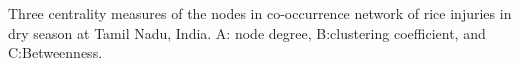 Three centrality measures of the nodes in co-occurrence network of rice injuries in dry season at Tamil Nadu, India. A: node degree, B:clustering coefficient, and C:Betweenness.
        \label{fig:nodepropTM_ds}